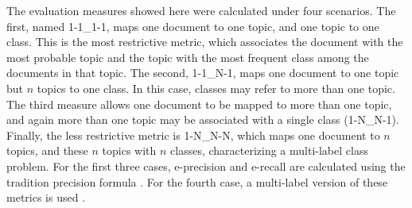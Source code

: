 The evaluation measures showed here were calculated under four scenarios. The first, named 1-1\_1-1, maps one document to one topic, and one topic to one class. This is the most restrictive metric, which associates the document with the most probable topic and the topic with the most frequent class among the documents in that topic. The second, 1-1\_N-1, maps one document to one topic but $n$ topics to one class. In this case, classes may refer to more than one topic. The third measure allows one document to be mapped to more than one topic, and again more than one topic may be associated with a single class (1-N\_N-1). Finally, the less restrictive metric is 1-N\_N-N, which maps one document to $n$ topics, and these $n$ topics with $n$ classes, characterizing a multi-label class problem.
For the first three cases, e-precision and e-recall are calculated using the tradition precision formula \cite{witten:2005}. For the fourth case, a multi-label version of these metrics is used \cite{tsoumakas2007multi}. 

